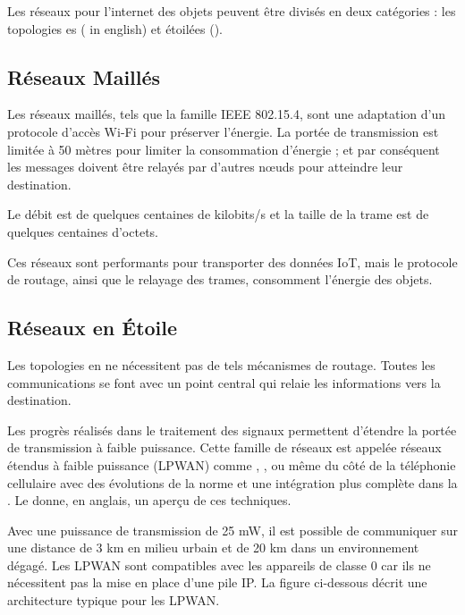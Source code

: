 Les réseaux pour l’internet des objets peuvent être divisés en deux catégories : les topologies es ( in english) et étoilées ().


\subsection*{Réseaux Maillés}

Les réseaux maillés, tels que la famille IEEE 802.15.4,  sont une adaptation d’un protocole d’accès Wi-Fi pour préserver l’énergie. La portée de transmission est limitée à 50 mètres pour limiter la consommation d'énergie ; et par conséquent les messages doivent être relayés par d’autres nœuds pour atteindre leur destination.

Le débit est de quelques centaines de kilobits/s et la taille de la trame est de quelques centaines d’octets. 

Ces réseaux sont performants pour transporter des données IoT, mais le protocole de routage, ainsi que le relayage des trames, consomment l’énergie des objets.

\subsection*{Réseaux en Étoile}

Les topologies en  ne nécessitent pas de tels mécanismes de routage. Toutes les communications se font avec un point central qui relaie les informations vers la destination.

Les progrès réalisés dans le traitement des signaux permettent d’étendre la portée de transmission à faible puissance. Cette famille de réseaux est appelée réseaux étendus à faible puissance (\ac{LPWAN}) comme , , ou même du côté de la téléphonie cellulaire avec des évolutions de la norme  et une intégration plus complète dans la . Le  donne, en anglais, un aperçu de ces techniques.


    \vspace{1em}

Avec une puissance de transmission de 25 mW, il est possible de communiquer sur une distance de 3 km en milieu urbain et de 20 km dans un environnement dégagé. Les \ac{LPWAN} sont compatibles avec les appareils de classe 0 car ils ne nécessitent pas la mise en place d’une pile \ac{IP}. La figure ci-dessous décrit une architecture typique pour les \ac{LPWAN}.

